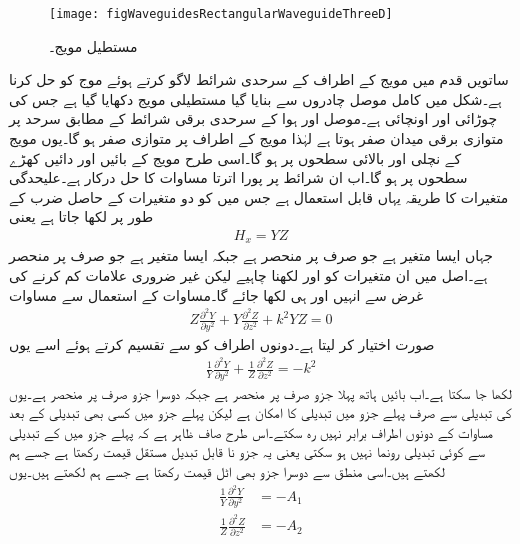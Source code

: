 \begin{figure}
\centering
\texttt{[image: figWaveguidesRectangularWaveguideThreeD]}
\caption{مستطیل مویج۔}
\label{شکل_مویج_مستطیل_مویج_اطراف}
\end{figure}
ساتویں قدم میں مویج کے اطراف کے سرحدی شرائط لاگو کرتے ہوئے موج کو حل کرنا ہے۔شکل  میں کامل موصل چادروں سے بنایا گیا مستطیلی مویج دکھایا گیا ہے جس کی چوڑائی  اور اونچائی  ہے۔موصل اور ہوا کے سرحدی برقی شرائط کے مطابق سرحد پر متوازی برقی میدان صفر ہوتا ہے لہٰذا مویج کے اطراف پر متوازی  صفر ہو گا۔یوں مویج کے نچلی اور  بالائی سطحوں پر  ہو گا۔اسی طرح مویج کے بائیں اور دائیں کھڑے سطحوں پر  ہو گا۔اب ان شرائط پر پورا اترتا مساوات  کا حل درکار ہے۔علیحدگی متغیرات کا طریقہ یہاں قابل استعمال ہے جس میں  کو دو متغیرات کے حاصل ضرب کے طور پر لکھا جاتا ہے یعنی
\begin{align}\label{مساوات_مویج_علیحدگی_متغیرات}
H_x=Y Z
\end{align}
جہاں  ایسا متغیر ہے جو صرف  پر منحصر ہے جبکہ  ایسا متغیر ہے جو صرف  پر منحصر ہے۔اصل میں ان متغیرات کو  اور  لکھنا چاہیے لیکن غیر ضروری علامات کم کرنے کی غرض سے انہیں  اور  ہی لکھا جائے گا۔مساوات   کے استعمال سے مساوات 
\begin{align}
Z \frac{\partial^2 Y}{\partial y^2}+Y \frac{\partial^2 Z}{\partial z^2}+k^2 Y Z =0
\end{align}
صورت اختیار کر لیتا ہے۔دونوں اطراف کو  سے تقسیم کرتے ہوئے اسے یوں
\begin{align}\label{مساوات_مویج_س}
\frac{1}{Y}\frac{\partial^2 Y}{\partial y^2}+\frac{1}{Z} \frac{\partial^2 Z}{\partial z^2}=-k^2
\end{align}
لکھا جا سکتا ہے۔اب بائیں ہاتھ پہلا جزو صرف  پر منحصر ہے  جبکہ دوسرا جزو صرف  پر منحصر ہے۔یوں  کی تبدیلی سے صرف پہلے جزو میں تبدیلی کا امکان ہے لیکن پہلے جزو میں کسی بھی تبدیلی کے بعد مساوات کے دونوں اطراف برابر نہیں رہ سکتے۔اس طرح صاف ظاہر ہے کہ پہلے جزو میں  کے تبدیلی سے کوئی تبدیلی رونما نہیں ہو سکتی یعنی یہ جزو نا قابل تبدیل مستقل قیمت رکھتا ہے جسے ہم  لکھتے ہیں۔اسی منطق سے دوسرا جزو بھی اٹل قیمت رکھتا ہے جسے ہم  لکھتے ہیں۔یوں
\begin{align}
\frac{1}{Y}\frac{\partial^2 Y}{\partial y^2}&=-A_1 \label{مساوات_مویج_ش}\\
\frac{1}{Z} \frac{\partial^2 Z}{\partial z^2}&=-A_2 \label{مساوات_مویج_ص}
\end{align} 
